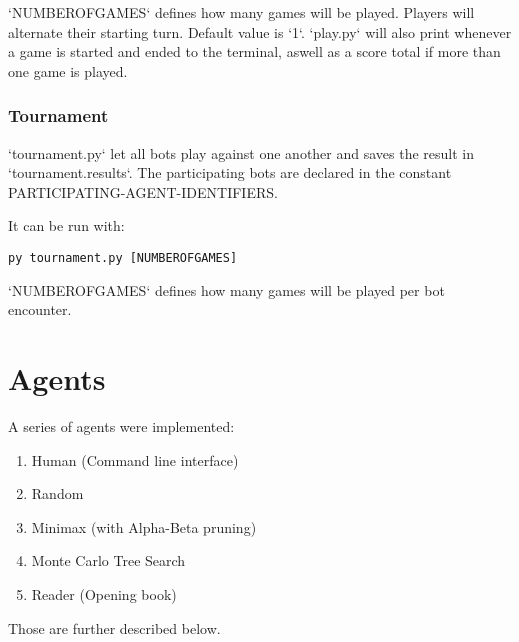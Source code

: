 `NUMBEROFGAMES` defines how many games will be played. Players will alternate their starting turn. Default value is `1`.
`play.py` will also print whenever a game is started and ended to the terminal, aswell as a score total if more than one game is played.

\subsubsection{Tournament}
`tournament.py` let all bots play against one another and saves the result
in `tournament.results`.
The participating bots are declared in the constant
PARTICIPATING-AGENT-IDENTIFIERS.

It can be run with:

\lstinline{py tournament.py [NUMBEROFGAMES]}

`NUMBEROFGAMES` defines how many games will be played per bot encounter.


\section{Agents}

A series of agents were implemented:
\begin{enumerate}
    \item Human (Command line interface)
    \item Random
    \item Minimax (with Alpha-Beta pruning)
    \item Monte Carlo Tree Search
    \item Reader (Opening book)
\end{enumerate}

Those are further described below.

